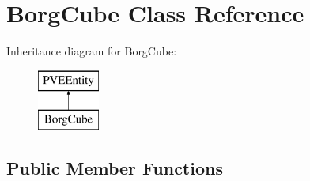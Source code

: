 \hypertarget{classBorgCube}{
\section{BorgCube Class Reference}
\label{d2/d93/classBorgCube}
}
Inheritance diagram for BorgCube:\begin{figure}[H]
\begin{center}
\leavevmode
\includegraphics[height=2cm]{d2/d93/classBorgCube}
\end{center}
\end{figure}
\subsection*{Public Member Functions}
